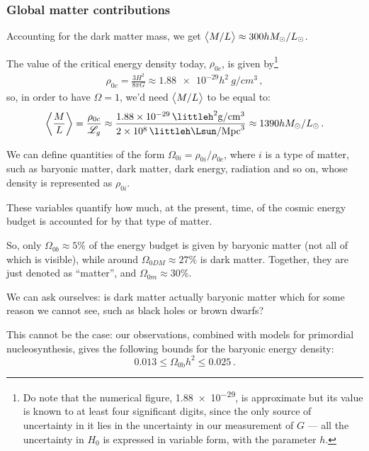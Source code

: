 \documentclass[main.tex]{subfiles}
\begin{document}
\subsubsection{Global matter contributions}

Accounting for the dark matter mass, we get \(\expval{M/L} \approx 300 h M_\odot / L_\odot\).

The value of the critical energy density today, \(\rho_{0c}\), is given by\footnote{Do note that the numerical figure, \num{1.88e-29}, is approximate but its value is known to at least four significant digits, since the only source of uncertainty in it lies in the uncertainty in our measurement of \(G\) --- all the uncertainty in \(H_0 \) is expressed in variable form, with the parameter \(h\).} 
%
\begin{align}
\rho_{0c} = \frac{3H^2}{8 \pi G}  \approx \num{1.88e-29} h^2 \SI{}{g /cm^3}
\,,
\end{align}
%
so, in order to have \(\Omega = 1\), we'd need \(\expval{M/L}\) to be equal to:
%
\begin{align}
\expval{\frac{M}{L}} 
= \frac{\rho_{0c}}{\mathscr{L}_{g}}
\approx \frac{\SI{1.88e-29}{\littleh^2 g /cm^{3}}}{\SI{2e8}{\littleh \Lsun /Mpc^{3}}}
\approx 1390 h M_{\odot} / L_{\odot}
\,.
\end{align}


We can define quantities of the form \(\Omega_{0i}  = \rho_{0i} / \rho_{0c}\), where \(i\) is a type of matter, such as baryonic matter, dark matter, dark energy, radiation and so on, whose density is represented as \(\rho_{0i}\).

These variables quantify how much, at the present, time, of the cosmic energy budget is accounted for by that type of matter.

So, only \(\Omega_{0b} \approx 5\%\) of the energy budget is given by baryonic matter (not all of which is visible), while around \(\Omega_{0 DM} \approx 27\%\) is dark matter.
Together, they are just denoted as ``matter'', and \(\Omega_{0m} \approx 30 \%\).

We can ask ourselves: is dark matter actually baryonic matter which for some reason we cannot see, such as black holes or brown dwarfs?

This cannot be the case: our observations, combined with models for primordial nucleosynthesis,
gives the following bounds for the baryonic energy density: 
%
\begin{equation}
0.013 \leq \Omega_{\text{0b}} h^2 \leq 0.025
\,.
\end{equation}
\end{document}
